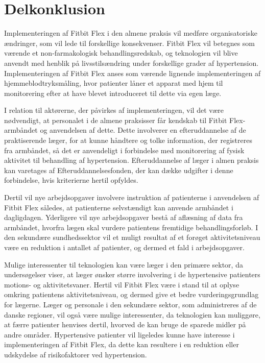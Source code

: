 \section{Delkonklusion}
Implementeringen af Fitbit Flex i den almene praksis vil medføre organisatoriske ændringer, som vil lede til forskellige konsekvenser. Fitbit Flex vil betegnes som værende et non-farmakologisk behandlingsredskab, og teknologien vil blive anvendt med henblik på livsstilsændring under forskellige grader af hypertension. Implementeringen af Fitbit Flex anses som værende lignende implementeringen af hjemmeblodtryksmåling, hvor patienter låner et apparat med hjem til monitorering efter at have blevet introduceret til dette via egen læge.

I relation til aktørerne, der påvirkes af implementeringen, vil det være nødvendigt, at personalet i de almene praksisser får kendskab til Fitbit Flex-armbåndet og anvendelsen af dette. Dette involverer en efteruddannelse af de praktiserende læger, for at kunne håndtere og tolke information, der registreres fra armbåndet, så det er anvendeligt i forbindelse med monitorering af fysisk aktivitet til behandling af hypertension. Efteruddannelse af læger i almen praksis kan varetages af Efteruddannelsesfonden, der kan dække udgifter i denne forbindelse, hvis kriterierne hertil opfyldes.

Dertil vil nye arbejdsopgaver involvere instruktion af patienterne i anvendelsen af Fitbit Flex således, at patienterne selvstændigt kan anvende armbåndet i dagligdagen. Yderligere vil nye arbejdsopgaver bestå af aflæsning af data fra armbåndet, hvorfra lægen skal vurdere patientens fremtidige behandlingsforløb. I den sekundære sundhedssektor vil et muligt resultat af et forøget aktivitetsniveau være en reduktion i antallet af patienter, og dermed et fald i arbejdsopgaver. 

Mulige interessenter til teknologien kan være læger i den primære sektor, da undersøgelser viser, at læger ønsker større involvering i de hypertensive patienters motions- og aktivitetsvaner. Hertil vil Fitbit Flex være i stand til at oplyse omkring patientens aktivitetsniveau, og dermed give et bedre vurderingsgrundlag for lægerne. Læger og personale i den sekundære sektor, som administreres af de danske regioner, vil også være mulige interessenter, da teknologien kan muliggøre, at færre patienter henvises dertil, hvorved de kan bruge de sparede midler på andre områder. 
Hypertensive patienter vil ligeledes kunne have interesse i implementeringen af Fitbit Flex, da dette kan resultere i en reduktion eller udskydelse af risikofaktorer ved hypertension.  






